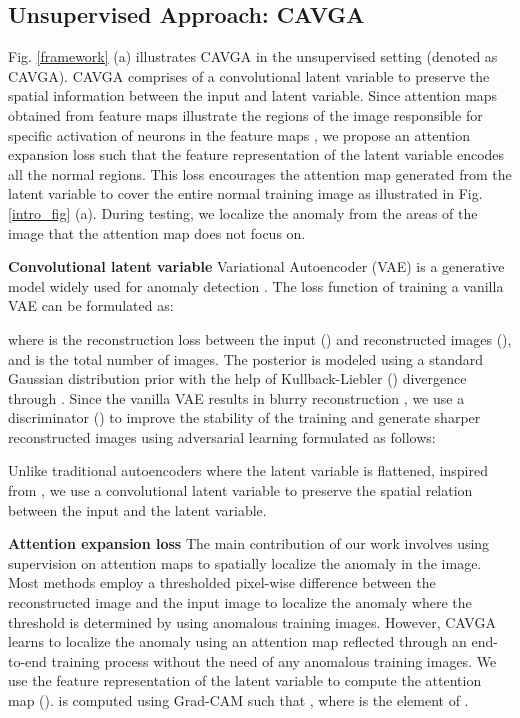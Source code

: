 \documentclass[runningheads]{llncs}
\begin{document}
\subsection{Unsupervised Approach: CAVGA}
\label{normal}
Fig. \ref{framework} (a) illustrates CAVGA in the unsupervised setting (denoted as CAVGA). CAVGA comprises of a convolutional latent variable to preserve the spatial information between the input and latent variable. Since attention maps obtained from feature maps illustrate the regions of the image responsible for specific activation of neurons in the feature maps \cite{zagoruyko2016paying}, we propose an attention expansion loss such that the feature representation of the latent variable encodes all the normal regions. This loss encourages the attention map generated from the latent variable to cover the entire normal training image as illustrated in Fig. \ref{intro_fig}  (a). During testing, we localize the anomaly from the areas of the image that the attention map does not focus on. 


\textbf{Convolutional latent variable}
\label{avae}
Variational Autoencoder (VAE) \cite{kingma2013auto} is a generative model widely used for anomaly detection \cite{pawlowski2018unsupervised, kiran2018overview}. The loss function of training a vanilla VAE can be formulated as:

where  is the reconstruction loss between the input () and reconstructed images (), and  is the total number of images. The posterior  is modeled using a standard Gaussian distribution prior  with the help of Kullback-Liebler () divergence through . Since the vanilla VAE results in blurry reconstruction \cite{larsen2015autoencoding}, we use a discriminator () to improve the stability of the training and generate sharper reconstructed images  using adversarial learning \cite{makhzani2015adversarial} formulated as follows:


Unlike traditional autoencoders \cite{gutoski2017detection,bergmann2018improving} where the latent variable is flattened, inspired from \cite{baur2018deep}, we use a convolutional latent variable to preserve the spatial relation between the input and the latent variable. 



\textbf{Attention expansion loss }
\label{unsuper_guided_attn}
The main contribution of our work involves using supervision on attention maps to spatially localize the anomaly in the image. Most methods  \cite{schlegl2017unsupervised,vu2019anomaly,akcay2018ganomaly} employ a thresholded pixel-wise difference between the reconstructed image and the input image to localize the anomaly where the threshold is determined by using anomalous training images. However, CAVGA learns to localize the anomaly using an attention map reflected through an end-to-end training process without the need of any anomalous training images. We use the feature representation of the latent variable  to compute the attention map ().  is computed using Grad-CAM \cite{selvaraju2017grad} such that , where  is the  element of .
\end{document}
